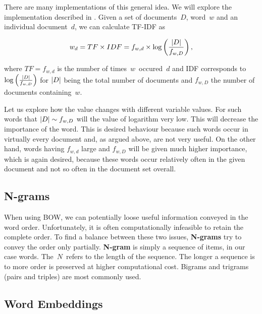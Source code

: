 There are many implementations of this general idea. We will explore the implementation described in \citet{Ramos03}. Given a set of documents~$D$, word~$w$ and an individual document~$d$,
we can calculate TF-IDF as

\[
	w_d = TF \times IDF = f_{w, d} \times \log \left( \frac{\left|{D}\right|}{f_{w,D}}  \right),
\]

where $TF = f_{w, d}$ is the number of times~$w$~occured~$d$ and IDF corresponds to $\log \left( \frac{\left|{D}\right|}{f_{w,D}}  \right)$ for $\left|{D}\right|$ being the total number of documents and $f_{w, D}$ the number of documents containing~$w$.

Let us explore how the value changes with different variable values. For such words that $\left|{D}\right| \sim f_{w, D}$ will the value of logarithm very low. This will decrease the importance of the word. This is desired behaviour because such words occur in virtually every document and, as argued above, are not very useful. On the other hand, words having $f_{w,d}$ large and $f_{w,D}$ will be given much higher importance, which is again desired, because these words occur relatively often in the given document and not so often in the document set overall.




\subsection{N-grams}

When using BOW, we can potentially loose useful information conveyed in the word order.
Unfortunately, it is often computationally infeasible to retain the complete order.
To find a balance between these two issues, {\bf N-grams} try to convey the order only partially.
{\bf N-gram} is simply a sequence of items, in our case words. The~$N$~refers to the length of the sequence.
The longer a sequence is to more order is preserved at higher computational cost.
Bigrams and trigrams (pairs and triples) are most commonly used.


\subsection{Word Embeddings}
\label{subsec:wordembed}

